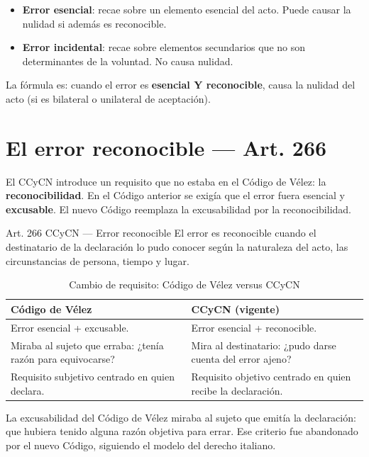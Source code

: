\documentclass[12pt,oneside]{book}
\begin{document}
\begin{itemize}
    \item \textbf{Error esencial}: recae sobre un elemento esencial del acto. Puede causar la nulidad si además es reconocible.
    \item \textbf{Error incidental}: recae sobre elementos secundarios que no son determinantes de la voluntad. No causa nulidad.
\end{itemize}

La fórmula es: cuando el error es \textbf{esencial Y reconocible}, causa la nulidad del acto (si es bilateral o unilateral de aceptación).

\section{El error reconocible --- Art. 266}

El CCyCN introduce un requisito que no estaba en el Código de Vélez: la \textbf{reconocibilidad}. En el Código anterior se exigía que el error fuera esencial y \textbf{excusable}. El nuevo Código reemplaza la excusabilidad por la reconocibilidad.

\begin{articulo}{Art. 266 CCyCN --- Error reconocible}
El error es reconocible cuando el destinatario de la declaración lo pudo conocer según la naturaleza del acto, las circunstancias de persona, tiempo y lugar.
\end{articulo}

\begin{table}[H]
\centering
\begin{tabularx}{\textwidth}{>{\raggedright\arraybackslash}X >{\raggedright\arraybackslash}X}
\toprule
\textbf{Código de Vélez} & \textbf{CCyCN (vigente)} \\
\midrule
Error esencial + excusable. & Error esencial + reconocible. \\[4pt]
Miraba al sujeto que erraba: ¿tenía razón para equivocarse? & Mira al destinatario: ¿pudo darse cuenta del error ajeno? \\[4pt]
Requisito subjetivo centrado en quien declara. & Requisito objetivo centrado en quien recibe la declaración. \\
\bottomrule
\end{tabularx}
\caption{Cambio de requisito: Código de Vélez versus CCyCN}
\end{table}

La excusabilidad del Código de Vélez miraba al sujeto que emitía la declaración: que hubiera tenido alguna razón objetiva para errar. Ese criterio fue abandonado por el nuevo Código, siguiendo el modelo del derecho italiano.
\end{document}
